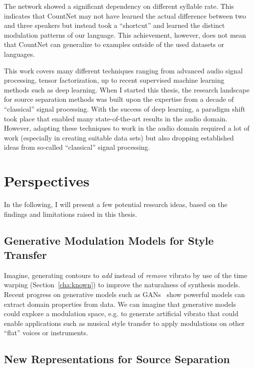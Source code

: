 The network showed a significant dependency on different syllable rate. This indicates that CountNet may not have learned the actual difference between two and three speakers but instead took a ``shortcut'' and learned the distinct modulation patterns of our language.
This achievement, however, does not mean that CountNet can generalize to examples outside of the used datasets or languages. 
\par
This work covers many different techniques ranging from advanced audio signal processing, tensor factorization, up to recent supervised machine learning methods such as deep learning.
When I started this thesis, the research landscape for source separation methods was built upon the expertise from a decade of “classical” signal processing.
With the success of deep learning, a paradigm shift took place that enabled many state-of-the-art results in the audio domain. However, adapting these techniques to work in the audio domain required a lot of work (especially in creating suitable data sets) but also dropping established ideas from so-called “classical” signal processing.

\section{Perspectives}

In the following, I will present a few potential research ideas, based on the findings and limitations raised in this thesis.

\subsection*{Generative Modulation Models for Style Transfer}
Imagine, generating contours to \emph{add} instead of \emph{remove} vibrato by use of the time warping (Section~\ref{cha:known}) to improve the naturalness of synthesis models.
Recent progress on generative models such as GANs~\cite{goodfellow14} show powerful models can extract domain properties from data.
We can imagine that generative models could explore a modulation space, e.g. to generate artificial vibrato that could enable applications such as musical style transfer to apply modulations on other ``flat'' voices or instruments.

\subsection*{New Representations for Source Separation}


